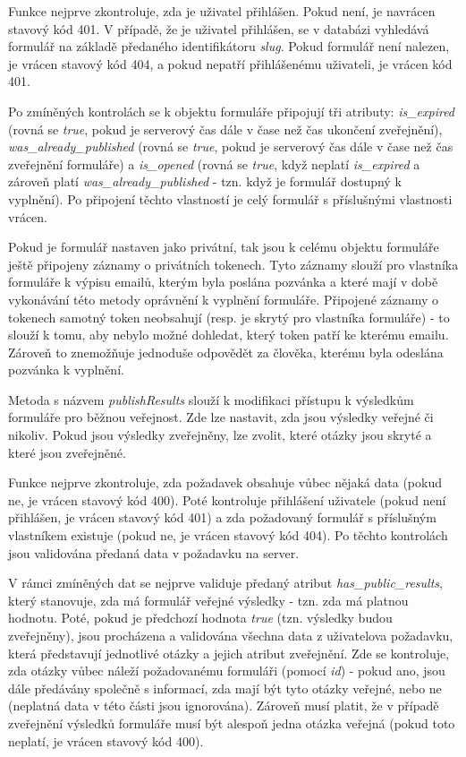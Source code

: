 			Funkce nejprve zkontroluje, zda je uživatel přihlášen. Pokud není, je navrácen stavový kód 401. V případě, že je uživatel přihlášen, se v databázi vyhledává formulář na základě předaného identifikátoru \textit{slug}. Pokud formulář není nalezen, je vrácen stavový kód 404, a pokud nepatří přihlášenému uživateli, je vrácen kód 401. 
			
			Po zmíněných kontrolách se k objektu formuláře připojují tři atributy: \textit{is\_expired} (rovná se \textit{true}, pokud je serverový čas dále v čase než čas ukončení zveřejnění), \textit{was\_already\_published} (rovná se \textit{true}, pokud je serverový čas dále v čase než čas zveřejnění formuláře) a \textit{is\_opened} (rovná se \textit{true}, když neplatí \textit{is\_expired} a zároveň platí \textit{was\_already\_published} - tzn. když je formulář dostupný k vyplnění). Po připojení těchto vlastností je celý formulář s příslušnými vlastnosti vrácen.
			
			Pokud je formulář nastaven jako privátní, tak jsou k celému objektu formuláře ještě připojeny záznamy o privátních tokenech. Tyto záznamy slouží pro vlastníka formuláře k výpisu emailů, kterým byla poslána pozvánka a které mají v době vykonávání této metody oprávnění k vyplnění formuláře. Připojené záznamy o tokenech samotný token neobsahují (resp. je skrytý pro vlastníka formuláře) - to slouží k tomu, aby nebylo možné dohledat, který token patří ke kterému emailu. Zároveň to znemožňuje jednoduše odpovědět za člověka, kterému byla odeslána pozvánka k vyplnění.
			
			Metoda s názvem \textit{publishResults} slouží k modifikaci přístupu k výsledkům formuláře pro běžnou veřejnost. Zde lze nastavit, zda jsou výsledky veřejné či nikoliv. Pokud jsou výsledky zveřejněny, lze zvolit, které otázky jsou skryté a které jsou zveřejněné.
			
			Funkce nejprve zkontroluje, zda požadavek obsahuje vůbec nějaká data (pokud ne, je vrácen stavový kód 400). Poté kontroluje přihlášení uživatele (pokud není přihlášen, je vrácen stavový kód 401) a zda požadovaný formulář s příslušným vlastníkem existuje (pokud ne, je vrácen stavový kód 404). Po těchto kontrolách jsou validována předaná data v požadavku na server.
			
			V rámci zmíněných dat se nejprve validuje předaný atribut \textit{has\_public\_results}, který stanovuje, zda má formulář veřejné výsledky - tzn. zda má platnou hodnotu. Poté, pokud je předchozí hodnota \textit{true} (tzn. výsledky budou zveřejněny), jsou procházena a validována všechna data z uživatelova požadavku, která představují jednotlivé otázky a jejich atribut zveřejnění. Zde se kontroluje, zda otázky vůbec náleží požadovanému formuláři (pomocí \textit{id}) - pokud ano, jsou dále předávány společně s informací, zda mají být tyto otázky veřejné, nebo ne (neplatná data v této části jsou ignorována). Zároveň musí platit, že v případě zveřejnění výsledků formuláře musí být alespoň jedna otázka veřejná (pokud toto neplatí, je vrácen stavový kód 400).
			
